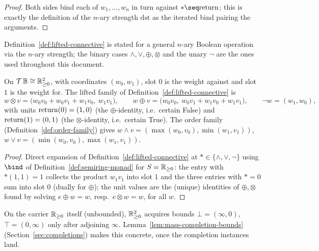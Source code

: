 \begin{proof}
\leanok
Both sides bind each of $w_1,\ldots,w_n$ in turn against $* \seq \Ret$;
this is exactly the definition of the $n$-ary strength $\mathrm{dst}$
as the iterated bind pairing the arguments.
\end{proof}

Definition~\ref{def:lifted-connective} is stated for a general $n$-ary
Boolean operation via the $n$-ary strength; the binary cases
$\wedge,\vee,\oplus,\otimes$ and the unary $\neg$ are the ones used
throughout this document.

\begin{lemma}
\label{lem:lifted-mass}
\leanok
On $\mathcal T\,\mathbb B \cong \mathbb R_{\ge 0}^2$, with coordinates $(w_0,w_1)$, slot
$0$ is the weight against and slot $1$ is the weight for. The lifted
family of Definition~\ref{def:lifted-connective} is
\[
  w \otimes v = \bigl(w_0v_0+w_0v_1+w_1v_0,\ w_1v_1\bigr), \qquad
  w \oplus v = \bigl(w_0v_0,\ w_0v_1+w_1v_0+w_1v_1\bigr), \qquad
  \neg w = (w_1, w_0),
\]
with units $\mathrm{return}(0) = (1,0)$ (the $\oplus$-identity, i.e.\ certain
False) and $\mathrm{return}(1) = (0,1)$ (the $\otimes$-identity, i.e.\ certain
True). The order family
(Definition~\ref{def:order-family}) gives
$w \wedge v = (\max(w_0,v_0), \min(w_1,v_1))$,
$w \vee v = (\min(w_0,v_0), \max(w_1,v_1))$.
\end{lemma}

\begin{proof}
\leanok
Direct expansion of Definition~\ref{def:lifted-connective}
at $*\in\{\wedge,\vee,\neg\}$ using $\bind$ of
Definition~\ref{def:semiring-monad} for $S=\mathbb R_{\ge 0}$: the entry with
$*(1,1)=1$ collects the product $w_1v_1$ into slot $1$ and the three
entries with $*=0$ sum into slot $0$ (dually for $\oplus$); the unit
values are the (unique) identities of $\oplus,\otimes$ found by solving
$e\oplus w = w$, resp.\ $e\otimes w = w$, for all $w$.
\end{proof}

On the carrier $\mathbb R_{\ge 0}$ itself (unbounded), $\mathbb R_{\ge 0}^2$ acquires bounds
$\bot=(\infty,0)$, $\top=(0,\infty)$ only after adjoining $\infty$.
Lemma~\ref{lem:mass-completion-bounds} (Section~\ref{sec:completions})
makes this concrete, once the completion instances land.

